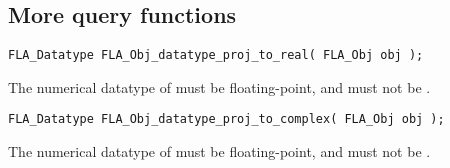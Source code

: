 \subsection{More query functions}




\begin{flaspec}
\begin{verbatim}
FLA_Datatype FLA_Obj_datatype_proj_to_real( FLA_Obj obj );
\end{verbatim}
\begin{checks}
\checkitem
The numerical datatype of \obj must be floating-point, and must not be
\flaconstantns.
\end{checks}
\begin{params}
\end{params}
\end{flaspec}


\begin{flaspec}
\begin{verbatim}
FLA_Datatype FLA_Obj_datatype_proj_to_complex( FLA_Obj obj );
\end{verbatim}
\begin{checks}
\checkitem
The numerical datatype of \obj must be floating-point, and must not be
\flaconstantns.
\end{checks}
\begin{params}
\end{params}
\end{flaspec}


